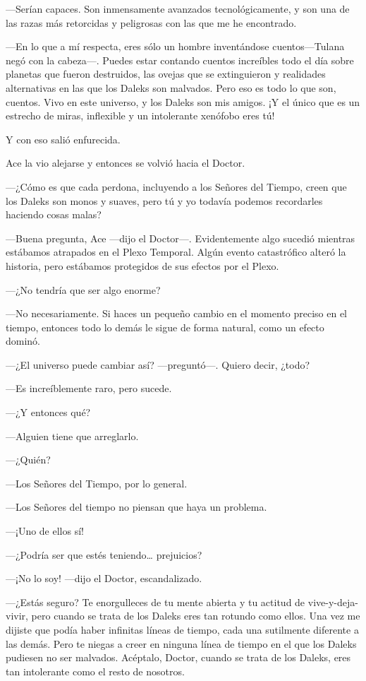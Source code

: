 ---Serían capaces. Son inmensamente avanzados tecnológicamente,
y son una de las razas más retorcidas y peligrosas con las que me he
encontrado.

---En lo que a mí respecta, eres sólo un hombre inventándose
cuentos---Tulana negó con la cabeza---. Puedes estar contando cuentos
increíbles todo el día sobre planetas que fueron destruidos, las ovejas
que se extinguieron y realidades alternativas en las que los Daleks son
malvados. Pero eso es todo lo que son, cuentos. Vivo en este universo, y
los Daleks son mis amigos. ¡Y el único que es un estrecho de miras,
inflexible y un intolerante xenófobo eres tú!

Y con eso salió enfurecida.

Ace la vio alejarse y entonces se volvió hacia el Doctor.

---¿Cómo es que cada perdona, incluyendo a los Señores del
Tiempo, creen que los Daleks son monos y suaves, pero tú y yo todavía
podemos recordarles haciendo cosas malas?

---Buena pregunta, Ace ---dijo el Doctor---. Evidentemente algo
sucedió mientras estábamos atrapados en el Plexo Temporal. Algún evento
catastrófico alteró la historia, pero estábamos protegidos de sus
efectos por el Plexo.

---¿No tendría que ser algo enorme?

---No necesariamente. Si haces un pequeño cambio en el momento
preciso en el tiempo, entonces todo lo demás le sigue de forma natural,
como un efecto dominó.

---¿El universo puede cambiar así? ---preguntó---. Quiero decir,
¿todo?

---Es increíblemente raro, pero sucede.

---¿Y entonces qué?

---Alguien tiene que arreglarlo.

---¿Quién?

---Los Señores del Tiempo, por lo general.

---Los Señores del tiempo no piensan que haya un problema.

---¡Uno de ellos sí!

---¿Podría ser que estés teniendo\ldots{} prejuicios?

---¡No lo soy! ---dijo el Doctor, escandalizado.

---¿Estás seguro? Te enorgulleces de tu mente abierta y tu
actitud de vive-y-deja-vivir, pero cuando se trata de los Daleks eres
tan rotundo como ellos. Una vez me dijiste que podía haber infinitas
líneas de tiempo, cada una sutilmente diferente a las demás. Pero te
niegas a creer en ninguna línea de tiempo en el que los Daleks pudiesen
no ser malvados. Acéptalo, Doctor, cuando se trata de los Daleks, eres
tan intolerante como el resto de nosotros.

